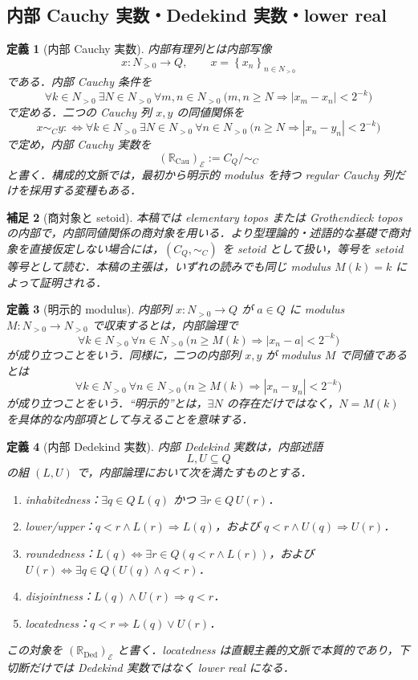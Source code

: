 \documentclass[a4paper,11pt]{ltjsarticle}
\theoremstyle{jpdef}
\newtheorem{definition}{定義}[section]
\newtheorem{remark}[definition]{補足}
\theoremstyle{jpthm}
\newcommand{\seq}[2]{\left\{#1\right\}_{#2}}
\newcommand{\RealDed}{\mathbb{R}_{\mathrm{Ded}}}
\newcommand{\RealCau}{\mathbb{R}_{\mathrm{Cau}}}
\begin{document}
\subsection{内部 Cauchy 実数・Dedekind 実数・lower real}

\begin{definition}[内部 Cauchy 実数]
内部有理列とは内部写像
\[
  x:N_{>0}\to Q,
  \qquad x=\seq{x_n}{n\in N_{>0}}
\]
である．内部 Cauchy 条件を
\[
  \forall k\in N_{>0}\ \exists N\in N_{>0}\ \forall m,n\in N_{>0}\
  \bigl(m,n\ge N\Rightarrow |x_m-x_n|<2^{-k}\bigr)
\]
で定める．二つの Cauchy 列 \(x,y\) の同値関係を
\[
  x\sim_C y
  :\Longleftrightarrow
  \forall k\in N_{>0}\ \exists N\in N_{>0}\ \forall n\in N_{>0}\
  \bigl(n\ge N\Rightarrow |x_n-y_n|<2^{-k}\bigr)
\]
で定め，内部 Cauchy 実数を
\[
  (\RealCau)_{\mathcal E}:=C_Q/{\sim_C}
\]
と書く．構成的文脈では，最初から明示的 modulus を持つ regular Cauchy 列だけを採用する変種もある．
\end{definition}

\begin{remark}[商対象と setoid]
本稿では elementary topos または Grothendieck topos の内部で，内部同値関係の商対象を用いる．より型理論的・述語的な基礎で商対象を直接仮定しない場合には，\((C_Q,\sim_C)\) を setoid として扱い，等号を setoid 等号として読む．本稿の主張は，いずれの読みでも同じ modulus \(M(k)=k\) によって証明される．
\end{remark}

\begin{definition}[明示的 modulus]
内部列 \(x:N_{>0}\to Q\) が \(a\in Q\) に modulus \(M:N_{>0}\to N_{>0}\) で収束するとは，内部論理で
\[
  \forall k\in N_{>0}\ \forall n\in N_{>0}\
  \bigl(n\ge M(k)\Rightarrow |x_n-a|<2^{-k}\bigr)
\]
が成り立つことをいう．同様に，二つの内部列 \(x,y\) が modulus \(M\) で同値であるとは
\[
  \forall k\in N_{>0}\ \forall n\in N_{>0}\
  \bigl(n\ge M(k)\Rightarrow |x_n-y_n|<2^{-k}\bigr)
\]
が成り立つことをいう．``明示的''とは，\(\exists N\) の存在だけではなく，\(N=M(k)\) を具体的な内部項として与えることを意味する．
\end{definition}

\begin{definition}[内部 Dedekind 実数]
内部 Dedekind 実数は，内部述語
\[
  L,U\subseteq Q
\]
の組 \((L,U)\) で，内部論理において次を満たすものとする．
\begin{enumerate}
\item inhabitedness：\(\exists q\in Q\,L(q)\) かつ \(\exists r\in Q\,U(r)\)．
\item lower/upper：\(q<r\land L(r)\Rightarrow L(q)\)，および \(q<r\land U(q)\Rightarrow U(r)\)．
\item roundedness：\(L(q)\Leftrightarrow\exists r\in Q(q<r\land L(r))\)，および \(U(r)\Leftrightarrow\exists q\in Q(U(q)\land q<r)\)．
\item disjointness：\(L(q)\land U(r)\Rightarrow q<r\)．
\item locatedness：\(q<r\Rightarrow L(q)\lor U(r)\)．
\end{enumerate}
この対象を \((\RealDed)_{\mathcal E}\) と書く．locatedness は直観主義的文脈で本質的であり，下切断だけでは Dedekind 実数ではなく lower real になる．
\end{definition}
\end{document}
